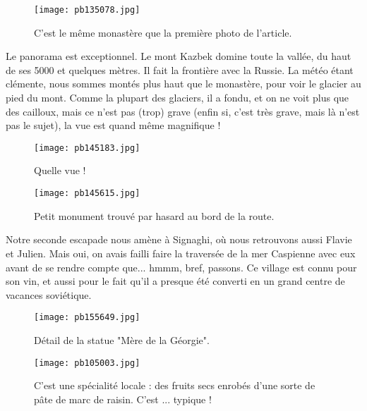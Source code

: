\documentclass{book}
\begin{document}
\begin{figure}[h]
\centering
\texttt{[image: pb135078.jpg]}
\caption*{C'est le même monastère que la première photo de l'article.}
\end{figure}

Le panorama est exceptionnel. Le mont Kazbek domine toute la vallée, du haut de ses 5000 et quelques mètres. Il fait la frontière avec la Russie. La météo étant clémente, nous sommes montés plus haut que le monastère, pour voir le glacier au pied du mont. Comme la plupart des glaciers, il a fondu, et on ne voit plus que des cailloux, mais ce n'est pas (trop) grave (enfin si, c'est très grave, mais là n'est pas le sujet), la vue est quand même magnifique !




\begin{figure}[h]
\centering
\texttt{[image: pb145183.jpg]}
\caption*{Quelle vue !}
\end{figure}


\begin{figure}[h]
\centering
\texttt{[image: pb145615.jpg]}
\caption*{Petit monument trouvé par hasard au bord de la route.}
\end{figure}

Notre seconde escapade nous amène à Signaghi, où nous retrouvons aussi Flavie et Julien. Mais oui, on avais failli faire la traversée de la mer Caspienne avec eux avant de se rendre compte que... hmmm, bref, passons. Ce village est connu pour son vin, et aussi pour le fait qu'il a presque été converti en un grand centre de vacances soviétique.




\begin{figure}[h]
\centering
\texttt{[image: pb155649.jpg]}
\caption*{Détail de la statue "Mère de la Géorgie".}
\end{figure}


\begin{figure}[h]
\centering
\texttt{[image: pb105003.jpg]}
\caption*{C'est une spécialité locale : des fruits secs enrobés d'une sorte de pâte de marc de raisin. C'est ... typique !}
\end{figure}
\end{document}
